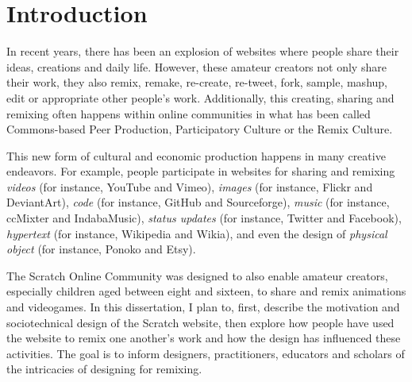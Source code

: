 \chapter{Introduction}

In recent years, there has been an explosion of websites where people share their ideas, creations and daily life.
However, these amateur creators not only share their work, they also remix, remake, re-create, re-tweet, fork, sample, mashup, edit or appropriate other people's work.
Additionally, this creating, sharing and remixing often happens within online communities in what has been called Commons-based Peer Production, Participatory Culture or the Remix Culture.

This new form of cultural and economic production happens in many creative endeavors.
For example, people participate in websites for sharing and remixing \emph{videos} (for instance, YouTube and Vimeo), \emph{images} (for instance, Flickr and DeviantArt), \emph{code} (for instance, GitHub and Sourceforge), \emph{music} (for instance, ccMixter and IndabaMusic), \emph{status updates} (for instance, Twitter and Facebook), \emph{hypertext} (for instance, Wikipedia and Wikia), and even the design of \emph{physical object} (for instance, Ponoko and Etsy).

The Scratch Online Community was designed to also enable amateur creators, especially children aged between eight and sixteen, to share and remix animations and videogames.
In this dissertation, I plan to, first, describe the motivation and sociotechnical design of the Scratch website, then explore how people have used the website to remix one another's work and how the design has influenced these activities.
The goal is to inform designers, practitioners, educators and scholars of the intricacies of designing for remixing.
